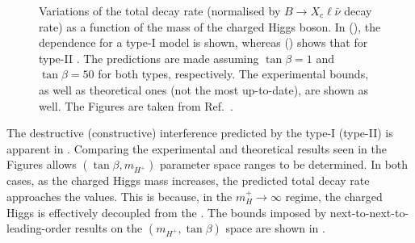 \begin{figure}[hbtp!]
    \centering
    \caption{\label{fig:xsgamma_br_2hdm} 
    Variations of the \BtoXsgamma total decay rate (normalised by $B\rightarrow X_c \ell\bar{\nu}$ decay rate) as a function of the mass of the charged Higgs boson.
    In (), the dependence for a type-I \TwoHDM model is shown, whereas () shows that for type-II \TwoHDM.
    The predictions are made assuming $\tan\beta=1$ and $\tan\beta=50$ for both types, respectively.
    The experimental bounds, as well as theoretical ones (not the most up-to-date), are shown as well.
    The Figures are taken from Ref.~\cite{Misiak:2017bgg}.}
\end{figure}

The destructive (constructive) interference predicted by the type-I (type-II)  is apparent in .
Comparing the experimental and theoretical results seen in the Figures allows $(\tan\beta,m_{H^+})$ parameter space ranges to be determined.
In both cases, as the charged Higgs mass increases, the predicted total decay rate approaches the \SM values.
This is because, in the $m_H^+\rightarrow\infty$ regime, the charged Higgs is effectively decoupled from the \SM.
The bounds imposed by next-to-next-to-leading-order \BtoXsgamma results on the $(m_{H^+},\tan\beta)$ space are shown in .

